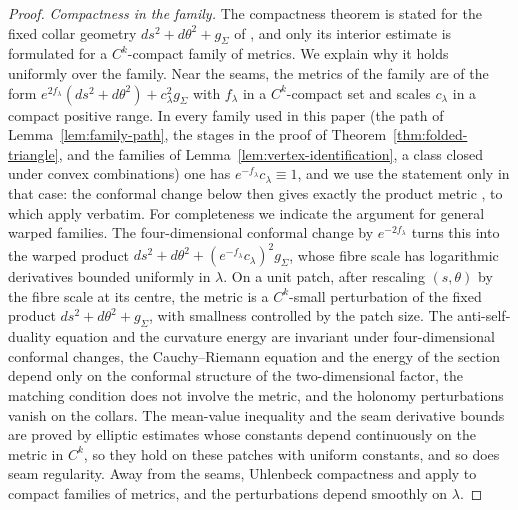 \documentclass[11pt]{amsart}
\theoremstyle{definition}
\theoremstyle{remark}
\theoremstyle{plain}
\numberwithin{equation}{section}
\begin{document}
\begin{proof}
\emph{Compactness in the family.} The compactness theorem
\cite[Theorem~3]{DFL-mixed} is stated for the fixed collar geometry
$ds^2+d\theta^2+g_\Sigma$ of \cite[(1.1)]{DFL-mixed}, and only its interior
estimate \cite[Lemma~4.50]{DFL-mixed} is formulated for a $C^k$-compact
family of metrics. We explain why it holds uniformly over the family. Near
the seams, the metrics of the family are of the form
$e^{2f_\lambda}(ds^2+d\theta^2)+c_\lambda^2g_\Sigma$ with $f_\lambda$ in a $C^k$-compact
set and scales $c_\lambda$ in a compact positive range. In every family used in
this paper (the path of Lemma~\ref{lem:family-path}, the stages in the proof
of Theorem~\ref{thm:folded-triangle}, and the families of
Lemma~\ref{lem:vertex-identification}, a class closed under convex combinations) one has $e^{-f_\lambda}c_\lambda\equiv1$, and we
use the statement only in that case: the conformal change below then gives
exactly the product metric \cite[(1.1)]{DFL-mixed}, to which
\cite[Theorem~4.2 and Lemma~4.25]{DFL-mixed} apply verbatim. For completeness we
indicate the argument for general warped families. The four-dimensional
conformal change by $e^{-2f_\lambda}$ turns this into the warped product
$ds^2+d\theta^2+(e^{-f_\lambda}c_\lambda)^2g_\Sigma$, whose fibre scale has
logarithmic derivatives bounded uniformly in $\lambda$. On a unit patch, after
rescaling $(s,\theta)$ by the fibre scale at its centre, the metric is a
$C^k$-small perturbation of the fixed product $ds^2+d\theta^2+g_\Sigma$, with
smallness controlled by the patch size. The anti-self-duality equation and the
curvature energy are invariant under four-dimensional conformal changes, the
Cauchy--Riemann equation and the energy of the section depend only on the
conformal structure of the two-dimensional factor, the matching condition
does not involve the metric, and the holonomy perturbations vanish on the
collars. The mean-value inequality \cite[Theorem~4.2]{DFL-mixed} and the seam
derivative bounds \cite[Lemma~4.25]{DFL-mixed} are proved by elliptic
estimates whose constants depend continuously on the metric in $C^k$, so they
hold on these patches with uniform constants, and so does seam regularity. Away from the seams, Uhlenbeck compactness and
\cite[Lemma~4.50]{DFL-mixed} apply to compact families of metrics, and the
perturbations depend smoothly on $\lambda$.


\end{proof}
\end{document}
